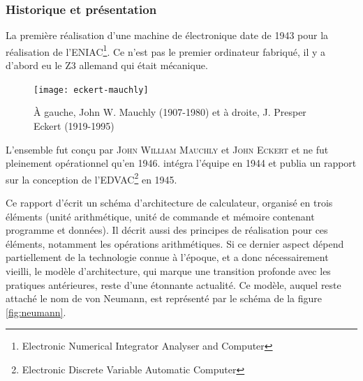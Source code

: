 \subsubsection{Historique et présentation}
La première réalisation d'une machine de  électronique date de 1943 pour la réalisation de l'ENIAC\footnote{Electronic Numerical Integrator Analyser and Computer}. Ce n'est pas le premier ordinateur fabriqué, il y a d'abord eu le Z3 allemand qui était mécanique.\par
\begin{figure}
  \centering
  \texttt{[image: eckert-mauchly]}
  \caption{\footnotesize{À gauche, John W. Mauchly (1907-1980) et à droite, J. Presper Eckert (1919-1995)}}
\end{figure}
\par L'ensemble fut conçu par \textsc{John William Mauchly} et \textsc{John Eckert}  et ne fut pleinement opérationnel qu'en 1946.  intégra l'équipe en 1944 et publia un rapport sur la conception de l'EDVAC\footnote{Electronic Discrete Variable Automatic Computer} en 1945.\par
Ce rapport d'écrit un schéma d'architecture de calculateur, organisé en trois éléments (unité arithmétique, unité de commande et mémoire contenant programme et données). Il décrit aussi des principes de réalisation pour ces éléments, notamment les opérations arithmétiques. Si ce dernier aspect dépend partiellement de la technologie connue à l'époque, et a donc nécessairement vieilli, le modèle d'architecture, qui marque une transition profonde avec les pratiques antérieures, reste d'une étonnante actualité. Ce modèle, auquel reste attaché le nom de von Neumann, est représenté par le schéma de la figure \ref{fig:neumann}.
